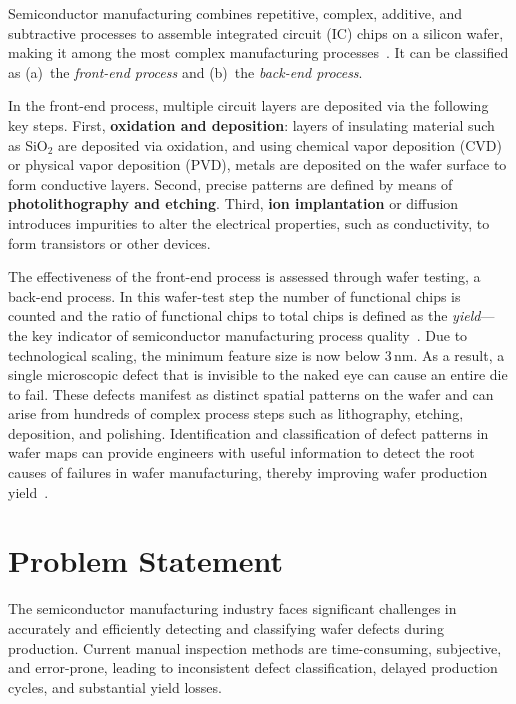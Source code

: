 \documentclass[conference]{IEEEtran}
\begin{document}
Semiconductor manufacturing combines repetitive, complex, additive, and
subtractive processes to assemble integrated circuit (IC) chips on a silicon
wafer, making it among the most complex manufacturing
processes~\cite{kahng2021}. It can be classified as (a)~the \emph{front-end
process} and (b)~the \emph{back-end process}.

In the front-end process, multiple circuit layers are deposited via the
following key steps. First, \textbf{oxidation and deposition}: layers of
insulating material such as SiO$_2$ are deposited via oxidation, and using
chemical vapor deposition (CVD) or physical vapor deposition (PVD), metals are
deposited on the wafer surface to form conductive layers. Second, precise
patterns are defined by means of \textbf{photolithography and etching}.
Third, \textbf{ion implantation} or diffusion introduces impurities to alter
the electrical properties, such as conductivity, to form transistors or other
devices.

The effectiveness of the front-end process is assessed through wafer testing,
a back-end process. In this wafer-test step the number of functional chips is
counted and the ratio of functional chips to total chips is defined as the
\emph{yield}---the key indicator of semiconductor manufacturing process
quality~\cite{weng2010}. Due to technological scaling, the minimum feature
size is now below 3\,nm. As a result, a single microscopic defect that is
invisible to the naked eye can cause an entire die to fail. These defects
manifest as distinct spatial patterns on the wafer and can arise from hundreds
of complex process steps such as lithography, etching, deposition, and
polishing. Identification and classification of defect patterns in wafer maps
can provide engineers with useful information to detect the root causes of
failures in wafer manufacturing, thereby improving wafer production
yield~\cite{chen2023}.

\section{Problem Statement}
\label{sec:problem}

The semiconductor manufacturing industry faces significant challenges in
accurately and efficiently detecting and classifying wafer defects during
production. Current manual inspection methods are time-consuming, subjective,
and error-prone, leading to inconsistent defect classification, delayed
production cycles, and substantial yield losses.
\end{document}
